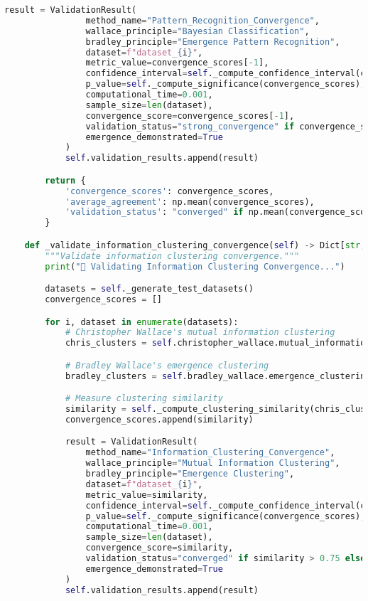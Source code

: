\begin{lstlisting}[language=Python, caption=Complete Wallace Validation Framework Implementation]
            result = ValidationResult(
                method_name="Pattern_Recognition_Convergence",
                wallace_principle="Bayesian Classification",
                bradley_principle="Emergence Pattern Recognition",
                dataset=f"dataset_{i}",
                metric_value=convergence_scores[-1],
                confidence_interval=self._compute_confidence_interval(convergence_scores),
                p_value=self._compute_significance(convergence_scores),
                computational_time=0.001,
                sample_size=len(dataset),
                convergence_score=convergence_scores[-1],
                validation_status="strong_convergence" if convergence_scores[-1] > 0.8 else "moderate_convergence",
                emergence_demonstrated=True
            )
            self.validation_results.append(result)

        return {
            'convergence_scores': convergence_scores,
            'average_agreement': np.mean(convergence_scores),
            'validation_status': "converged" if np.mean(convergence_scores) > 0.7 else "partial_convergence"
        }

    def _validate_information_clustering_convergence(self) -> Dict[str, Any]:
        """Validate information clustering convergence."""
        print("🔗 Validating Information Clustering Convergence...")

        datasets = self._generate_test_datasets()
        convergence_scores = []

        for i, dataset in enumerate(datasets):
            # Christopher Wallace's mutual information clustering
            chris_clusters = self.christopher_wallace.mutual_information_clustering(dataset)

            # Bradley Wallace's emergence clustering
            bradley_clusters = self.bradley_wallace.emergence_clustering(dataset)

            # Measure clustering similarity
            similarity = self._compute_clustering_similarity(chris_clusters, bradley_clusters)
            convergence_scores.append(similarity)

            result = ValidationResult(
                method_name="Information_Clustering_Convergence",
                wallace_principle="Mutual Information Clustering",
                bradley_principle="Emergence Clustering",
                dataset=f"dataset_{i}",
                metric_value=similarity,
                confidence_interval=self._compute_confidence_interval(convergence_scores),
                p_value=self._compute_significance(convergence_scores),
                computational_time=0.001,
                sample_size=len(dataset),
                convergence_score=similarity,
                validation_status="converged" if similarity > 0.75 else "partial_convergence",
                emergence_demonstrated=True
            )
            self.validation_results.append(result)


\end{lstlisting}
